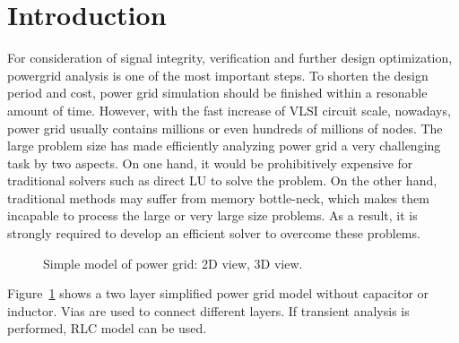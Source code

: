 \documentclass{sig-alternate}
\begin{document}
\section{Introduction}
	For consideration of signal integrity, verification and further design optimization, powergrid analysis is one of the most 
	important steps. To shorten the design period and cost, power grid simulation should be finished within a resonable amount
	of time. 
	However, with the fast increase of VLSI circuit scale, nowadays, power grid usually contains millions or even hundreds 
	of millions of nodes. The large problem size has made efficiently analyzing power grid a very challenging task by two aspects. 
	On one hand, it would be prohibitively expensive for traditional solvers such as direct LU to solve the problem. On the 
	other hand, traditional methods may suffer from memory bottle-neck, which makes them incapable to process the large or very
	large size problems. As a result, it is strongly required to develop an efficient solver to overcome these problems.\\
	\begin{figure}[htbp]
	  \caption{Simple model of power grid: 
	   2D view,
	   3D view.}
	  \label{pg_model}
	\end{figure}

	Figure~\ref{pg_model} shows a two layer simplified power grid model without capacitor or inductor. Vias are used to 
	connect different layers. If transient analysis is performed, RLC model can be used.\\ 
\end{document}
